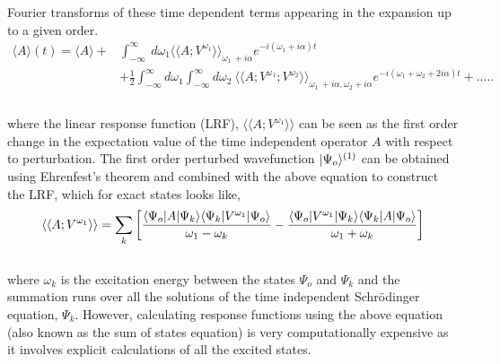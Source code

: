 Fourier transforms of these time dependent terms appearing in the expansion up to a given order.
\\
\begin{equation}
\begin{split}
\langle A \rangle (t) = \langle A \rangle + & \int_{-\infty}^{\infty}\
d\omega_1{\langle\langle A;V^{\omega_1}\rangle\rangle}_{\omega_1  \
+ i\alpha}e^{-i(\omega_1 + i\alpha)t} \\
& + \frac{1}{2} \int_{-\infty}^{\infty}d\omega_1\int_{-\infty}^{\infty}d\omega_2\
{\langle\langle A;V^{\omega_1};V^{\omega_2}\rangle\rangle}_{\omega_1 \
+ i\alpha,\omega_2 + i\alpha}e^{-i(\omega_1 + \omega_2 + 2i\alpha)t} + ..... \\
\end{split}
\end{equation}
\\
where the linear response function (LRF), $\langle\langle A;V^{\omega_1}\rangle\rangle$ can be
seen as the first order change in the expectation value of the time independent operator $A$ 
with respect to perturbation. The first order perturbed wavefunction $| \Psi_o \rangle^{(1)}$
can be obtained using Ehrenfest's theorem and combined with the above equation to construct 
the LRF, which for exact states looks like,
\\
\begin{equation}
\langle\langle A;V^{\omega_1}\rangle\rangle = \sum_k\bigg[
\frac{\langle \Psi_o |A| \Psi_k \rangle\langle \Psi_k |V^{\omega_1}| \Psi_o \rangle}{\omega_1
- \omega_k}  -
\frac{\langle \Psi_o |V^{\omega_1}| \Psi_k \rangle\langle \Psi_k |A| \Psi_o \rangle}{\omega_1 + \omega_k}\bigg]
\end{equation}
\\
where $\omega_k$ is the excitation energy between the states $\Psi_o$ and $\Psi_k$ 
and the summation runs over all the solutions of the time independent Schr\"odinger equation, $\Psi_k$.
However, calculating response functions using the above equation (also known as the sum of states equation)
is very computationally expensive as it involves explicit calculations of all the excited states.
